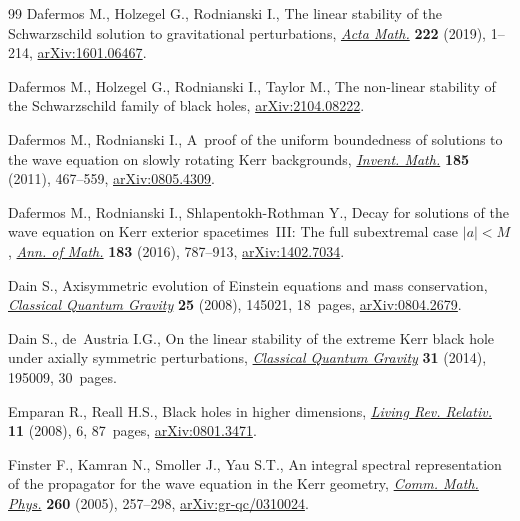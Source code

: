 \documentclass[pdftex]{sigma}
\numberwithin{equation}{section}
\begin{document}
\begin{thebibliography}{99}
Dafermos M., Holzegel G., Rodnianski I., The linear stability of the
 {S}chwarzschild solution to gravitational perturbations,
 \href{https://doi.org/10.4310/ACTA.2019.v222.n1.a1}{\textit{Acta Math.}}
 \textbf{222} (2019), 1--214,
 \href{http://arxiv.org/abs/1601.06467}{arXiv:1601.06467}.

Dafermos M., Holzegel G., Rodnianski I., Taylor M., The non-linear stability of
 the {S}chwarzschild family of black holes,
 \href{http://arxiv.org/abs/2104.08222}{arXiv:2104.08222}.

Dafermos M., Rodnianski I., A~proof of the uniform boundedness of solutions to
 the wave equation on slowly rotating {K}err backgrounds,
 \href{https://doi.org/10.1007/s00222-010-0309-0}{\textit{Invent. Math.}}
 \textbf{185} (2011), 467--559,
 \href{http://arxiv.org/abs/0805.4309}{arXiv:0805.4309}.

Dafermos M., Rodnianski I., Shlapentokh-Rothman Y., Decay for solutions of the
 wave equation on {K}err exterior spacetimes~{III}: {T}he full subextremal
 case {$|a|<M$},
 \href{https://doi.org/10.4007/annals.2016.183.3.2}{\textit{Ann. of Math.}}
 \textbf{183} (2016), 787--913,
 \href{http://arxiv.org/abs/1402.7034}{arXiv:1402.7034}.

Dain S., Axisymmetric evolution of {E}instein equations and mass conservation,
 \href{https://doi.org/10.1088/0264-9381/25/14/145021}{\textit{Classical
 Quantum Gravity}} \textbf{25} (2008), 145021, 18~pages,
 \href{http://arxiv.org/abs/0804.2679}{arXiv:0804.2679}.

Dain S., de~Austria I.G., On the linear stability of the extreme {K}err black
 hole under axially symmetric perturbations,
 \href{https://doi.org/10.1088/0264-9381/31/19/195009}{\textit{Classical
 Quantum Gravity}} \textbf{31} (2014), 195009, 30~pages.

Emparan R., Reall H.S., Black holes in higher dimensions,
 \href{https://doi.org/10.12942/lrr-2008-6}{\textit{Living Rev. Relativ.}}
 \textbf{11} (2008), 6, 87~pages,
 \href{http://arxiv.org/abs/0801.3471}{arXiv:0801.3471}.

Finster F., Kamran N., Smoller J., Yau S.T., An integral spectral
 representation of the propagator for the wave equation in the {K}err
 geometry, \href{https://doi.org/10.1007/s00220-005-1390-x}{\textit{Comm.
 Math. Phys.}} \textbf{260} (2005), 257--298,
 \href{http://arxiv.org/abs/gr-qc/0310024}{arXiv:gr-qc/0310024}.


\end{thebibliography}
\end{document}
